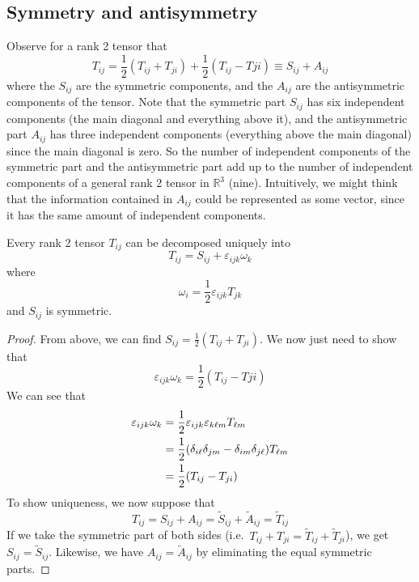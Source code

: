 \subsection{Symmetry and antisymmetry}
Observe for a rank 2 tensor that
\[
	T_{ij} = \frac{1}{2}\left( T_{ij} + T_{ji} \right) + \frac{1}{2}\left( T_{ij} - T{ji} \right) \equiv S_{ij} + A_{ij}
\]
where the \(S_{ij}\) are the symmetric components, and the \(A_{ij}\) are the antisymmetric components of the tensor.
Note that the symmetric part \(S_{ij}\) has six independent components (the main diagonal and everything above it), and the antisymmetric part \(A_{ij}\) has three independent components (everything above the main diagonal) since the main diagonal is zero.
So the number of independent components of the symmetric part and the antisymmetric part add up to the number of independent components of a general rank 2 tensor in \(\mathbb R^3\) (nine).
Intuitively, we might think that the information contained in \(A_{ij}\) could be represented as some vector, since it has the same amount of independent components.
\begin{proposition}
	Every rank 2 tensor \(T_{ij}\) can be decomposed uniquely into
	\[
		T_{ij} = S_{ij} + \varepsilon_{ijk} \omega_k
	\]
	where
	\[
		\omega_i = \frac{1}{2}\varepsilon_{ijk} T_{jk}
	\]
	and \(S_{ij}\) is symmetric.
\end{proposition}
\begin{proof}
	From above, we can find \(S_{ij} = \frac{1}{2}\left( T_{ij} + T_{ji} \right)\).
	We now just need to show that
	\[
		\varepsilon_{ijk} \omega_k = \frac{1}{2}\left( T_{ij} - T{ji} \right)
	\]
	We can see that
	\begin{align*}
		\varepsilon_{ijk} \omega_k & = \frac{1}{2}\varepsilon_{ijk} \varepsilon_{k\ell m} T_{\ell m}                      \\
		                           & = \frac{1}{2}\qty(\delta_{i\ell} \delta_{jm} - \delta_{im}\delta_{j\ell}) T_{\ell m} \\
		                           & = \frac{1}{2}\qty(T_{ij} - T_{ji})
	\end{align*}
	To show uniqueness, we now suppose that
	\[
		T_{ij} = S_{ij} + A_{ij} = \widetilde{S}_{ij} + \widetilde{A}_{ij} = \widetilde{T}_{ij}
	\]
	If we take the symmetric part of both sides (i.e.\ \(T_{ij} + T_{ji} = \widetilde{T}_{ij} + \widetilde{T}_{ji}\)), we get \(S_{ij} = \widetilde{S}_{ij}\).
	Likewise, we have \(A_{ij} = \widetilde{A}_{ij}\) by eliminating the equal symmetric parts.
\end{proof}

